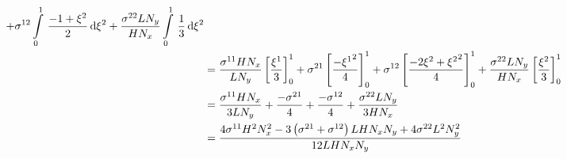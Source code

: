 \begin{equation}
\begin{aligned}
    +\conductivitytensorsymbol^{12}\gint{0}{1}{\dfrac{-1+\xitwo}{2}}{\xitwo}
    +\dfrac{\conductivitytensorsymbol^{22} L N_{y}}{H N_{x}}\gint{0}{1}{\dfrac{1}{3}}{\xitwo} \\
    &=\dfrac{\conductivitytensorsymbol^{11} H N_{x}}{L N_{y}}\sqbrac{\dfrac{\xione}{3}}^{1}_{0}
    +\conductivitytensorsymbol^{21}\sqbrac{\dfrac{-\xionesq}{4}}^{1}_{0}
    +\conductivitytensorsymbol^{12}\sqbrac{\dfrac{-2\xitwo+\xitwosq}{4}}^{1}_{0}
    +\dfrac{\conductivitytensorsymbol^{22} L N_{y}}{H N_{x}}\sqbrac{\dfrac{\xitwo}{3}}^{1}_{0} \\
    &=\dfrac{\conductivitytensorsymbol^{11} H N_{x}}{3 L N_{y}}+\dfrac{-\conductivitytensorsymbol^{21}}{4}+
    \dfrac{-\conductivitytensorsymbol^{12}}{4}+\dfrac{\conductivitytensorsymbol^{22} L N_{y}}{3 H N_{x}} \\
    &=\dfrac{4\conductivitytensorsymbol^{11}H^{2}N_{x}^{2}-3\pbrac{\conductivitytensorsymbol^{21}+
        \conductivitytensorsymbol^{12}}L H N_{x} N_{y}+4\conductivitytensorsymbol^{22}L^{2}N_{y}^{2}}{12 L H N_{x} N_{y}}
  \end{aligned}
\end{equation}


